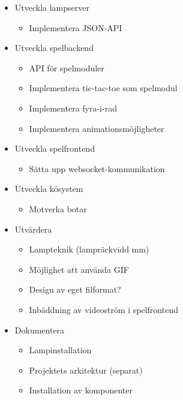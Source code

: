 \documentclass[a4paper,11pt]{article}
\begin{document}
  \begin{itemize}

    \item Utveckla lampserver
      \begin{itemize}
        \item Implementera JSON-API
      \end{itemize}

    \item Utveckla spelbackend
      \begin{itemize}
        \item API för spelmoduler
        \item Implementera tic-tac-toe som spelmodul
        \item Implementera fyra-i-rad
        \item Implementera animationsmöjligheter
      \end{itemize}

    \item Utveckla spelfrontend
      \begin{itemize}
        \item Sätta upp websocket-kommunikation
      \end{itemize}

    \item Utveckla kösystem
      \begin{itemize}
        \item Motverka botar
      \end{itemize}

    \item Utvärdera
      \begin{itemize}
        \item Lampteknik (lampräckvidd mm)
        \item Möjlighet att använda GIF
        \item Design av eget filformat?
        \item Inbäddning av videoström i spelfrontend
      \end{itemize}

    \item Dokumentera
      \begin{itemize}
        \item Lampinstallation
        \item Projektets arkitektur (separat)
        \item Installation av komponenter
      \end{itemize}

  \end{itemize}
\end{document}
